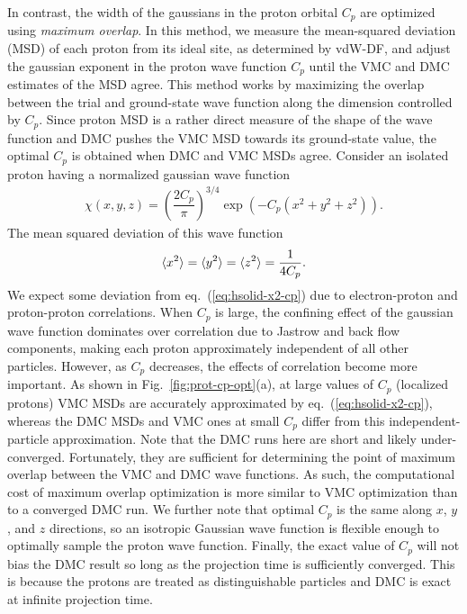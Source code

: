 In contrast, the width of the gaussians in the proton orbital $C_p$ are optimized using \emph{maximum overlap}.
In this method, we measure the mean-squared deviation (MSD) of each proton from its ideal site, as determined by vdW-DF, and adjust the gaussian exponent in the proton wave function $C_p$ until the VMC and DMC estimates of the MSD agree.
This method works by maximizing the overlap between the trial and ground-state wave function along the dimension controlled by $C_p$.
Since proton MSD is a rather direct measure of the shape of the wave function and DMC pushes the VMC MSD towards its ground-state value, the optimal $C_p$ is obtained when DMC and VMC MSDs agree.
Consider an isolated proton having a normalized gaussian wave function
\begin{align}
\chi(x, y, z) = \left(\dfrac{2C_p}{\pi}\right)^{3/4} \exp\left(
-C_p(x^2+y^2+z^2)
\right).
\end{align}
The mean squared deviation of this wave function
\begin{align} \label{eq:hsolid-x2-cp}
\braket{x^2}=\braket{y^2}=\braket{z^2}=\dfrac{1}{4C_p}.
\end{align}
We expect some deviation from eq.~(\ref{eq:hsolid-x2-cp}) due to electron-proton and proton-proton correlations. When $C_p$ is large, the confining effect of the gaussian wave function dominates over correlation due to Jastrow and back flow components, making each proton approximately independent of all other particles.
However, as $C_p$ decreases, the effects of correlation become more important. As shown in Fig.~\ref{fig:prot-cp-opt}(a), at large values of $C_p$ (localized protons) VMC MSDs are accurately approximated by eq.~(\ref{eq:hsolid-x2-cp}), whereas the DMC MSDs and VMC ones at small $C_p$ differ from this independent-particle approximation.
Note that the DMC runs here are short and likely under-converged.
Fortunately, they are sufficient for determining the point of maximum overlap between the VMC and DMC wave functions.
As such, the computational cost of maximum overlap optimization is more similar to VMC optimization than to a converged DMC run.
We further note that optimal $C_p$ is the same along $x$, $y$, and $z$ directions, so an isotropic Gaussian wave function is flexible enough to optimally sample the proton wave function.
Finally, the exact value of $C_p$ will not bias the DMC result so long as the projection time is sufficiently converged. This is because the protons are treated as distinguishable particles and DMC is exact at infinite projection time.

